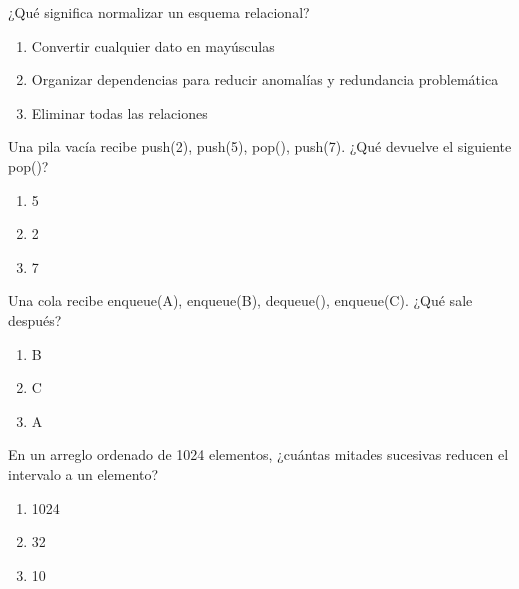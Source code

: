\noindent\begin{minipage}{\linewidth}\setlength{\parskip}{4pt}\label{q:S-070}
¿Qué significa normalizar un esquema relacional?
\begin{enumerate}[label=\Alph*),nosep]
\item Convertir cualquier dato en mayúsculas
\item Organizar dependencias para reducir anomalías y redundancia problemática
\item Eliminar todas las relaciones
\end{enumerate}\end{minipage}\par\medskip

\noindent\begin{minipage}{\linewidth}\setlength{\parskip}{4pt}\label{q:S-071}
Una pila vacía recibe push(2), push(5), pop(), push(7). ¿Qué devuelve el siguiente pop()?
\begin{enumerate}[label=\Alph*),nosep]
\item 5
\item 2
\item 7
\end{enumerate}\end{minipage}\par\medskip

\noindent\begin{minipage}{\linewidth}\setlength{\parskip}{4pt}\label{q:S-072}
Una cola recibe enqueue(A), enqueue(B), dequeue(), enqueue(C). ¿Qué sale después?
\begin{enumerate}[label=\Alph*),nosep]
\item B
\item C
\item A
\end{enumerate}\end{minipage}\par\medskip

\noindent\begin{minipage}{\linewidth}\setlength{\parskip}{4pt}\label{q:S-073}
En un arreglo ordenado de 1024 elementos, ¿cuántas mitades sucesivas reducen el intervalo a un elemento?
\begin{enumerate}[label=\Alph*),nosep]
\item 1024
\item 32
\item 10
\end{enumerate}\end{minipage}\par\medskip

